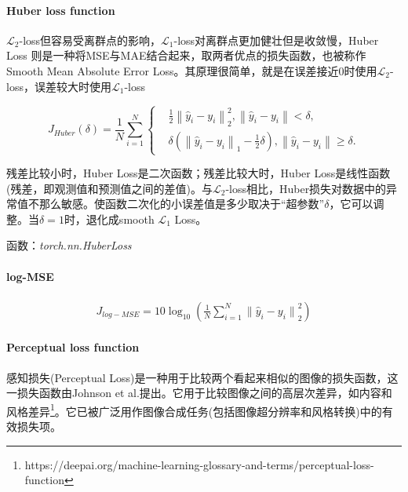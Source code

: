 \documentclass[letterpaper,12pt]{article}
\begin{document}
	\paragraph{Huber loss function}
	
	$\mathcal{L}_2$-loss但容易受离群点的影响，$\mathcal{L}_1$-loss对离群点更加健壮但是收敛慢，Huber Loss 则是一种将MSE与MAE结合起来，取两者优点的损失函数，也被称作Smooth Mean Absolute Error Loss。其原理很简单，就是在误差接近0时使用$\mathcal{L}_2$-loss，误差较大时使用$\mathcal{L}_1$-loss
	
	\begin{equation}
		J_{Huber}(\delta)= \frac{1}{N}\sum_{i=1}^{N}
		\left\{
		\begin{aligned}
			&\frac{1}{2}{\left\|\hat{y}_i - y_i \right\|}_2^{2}, \left\| \hat{y}_i -y_i \right\| < \delta , \\
			&\delta\left({\left\|\hat{y}_i - y_i \right\|}_1 - \frac{1}{2}\delta \right), \left\| \hat{y}_i -y_i \right\| \geq \delta.
		\end{aligned}
		\right.
	\end{equation}
	
	残差比较小时，Huber Loss是二次函数；残差比较大时，Huber Loss是线性函数(残差，即观测值和预测值之间的差值)。与$\mathcal{L}_2$-loss相比，Huber损失对数据中的异常值不那么敏感。使函数二次化的小误差值是多少取决于“超参数”$\delta$，它可以调整。当$\delta=1$时，退化成smooth $\mathcal{L}_1$ Loss。
	
	函数：\textit{torch.nn.HuberLoss}
	
	\paragraph{log-MSE}
	
	\begin{equation}
		\begin{aligned}
			J_{log-MSE} = 10\log_{10}\left(\frac{1}{N} \sum_{i=1}^{N} {\| \hat{y}_i - y_i \|}_{2}^2 \right)
		\end{aligned}
	\end{equation}
	
	\paragraph{Perceptual loss function}
	
	感知损失(Perceptual Loss)是一种用于比较两个看起来相似的图像的损失函数，这一损失函数由Johnson et al.\cite{johnson2016perceptual}提出。它用于比较图像之间的高层次差异，如内容和风格差异\footnote{https://deepai.org/machine-learning-glossary-and-terms/perceptual-loss-function}。它已被广泛用作图像合成任务(包括图像超分辨率和风格转换)中的有效损失项。
	
\end{document}

